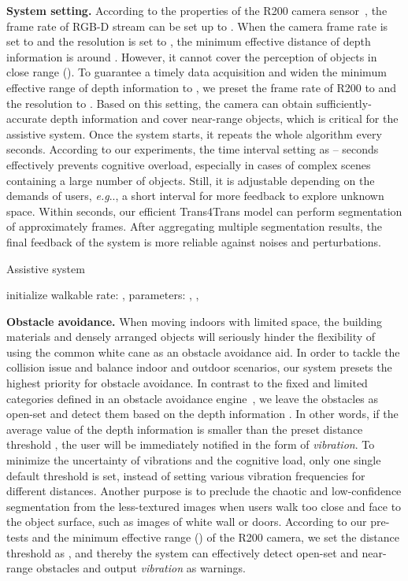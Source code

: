 \documentclass[journal]{IEEEtran}
\makeatletter
\DeclareRobustCommand\onedot{\futurelet\@let@token\@onedot}
\def\@onedot{\ifx\@let@token.\else.\null\fi\xspace}
\def\eg{\emph{e.g}\onedot} \def\Eg{\emph{E.g}\onedot}
\makeatother
\begin{document}
\noindent\textbf{System setting.}
According to the properties of the R200 camera sensor~\cite{keselman2017intel}, the frame rate of RGB-D stream can be set up to . When the camera frame rate is set to  and the resolution is set to , the minimum effective distance of depth information is around . However, it cannot cover the perception of objects in close range (). To guarantee a timely data acquisition and widen the minimum effective range of depth information to , we preset the frame rate of R200 to  and the resolution to .
Based on this setting, the camera can obtain sufficiently-accurate depth information and cover near-range objects, which is critical for the assistive system.
Once the system starts, it repeats the whole algorithm every  seconds. 
According to our experiments, the time interval setting as -- seconds effectively prevents cognitive overload, especially in cases of complex scenes containing a large number of objects. Still, it is adjustable depending on the demands of users, \eg, a short interval for more feedback to explore unknown space. Within  seconds, our efficient Trans4Trans model can perform segmentation of approximately  frames. After aggregating multiple segmentation results, the final feedback of the system is more reliable against noises and perturbations.

\begin{algorithm}[!t]
	\caption{Assistive system}
	\label{algo:system}
    initialize walkable rate: , parameters: , ,  \;
\end{algorithm}

\noindent\textbf{Obstacle avoidance.}
When moving indoors with limited space, the building materials and densely arranged objects will seriously hinder the flexibility of using the common white cane as an obstacle avoidance aid.
In order to tackle the collision issue and balance indoor and outdoor scenarios, our system presets the highest priority for obstacle avoidance.
In contrast to the fixed and limited categories defined in an obstacle avoidance engine~\cite{lin2019deep}, we leave the obstacles as open-set and detect them based on the depth information .
In other words, if the average value of the depth information  is smaller than the preset distance threshold , the user will be immediately notified in the form of \emph{vibration}. To minimize the uncertainty of vibrations and the cognitive load, only one single default threshold is set, instead of setting various vibration frequencies for different distances. Another purpose is to preclude the chaotic and low-confidence segmentation from the less-textured images when users walk too close and face to the object surface, such as images of white wall or doors. According to our pre-tests and the minimum effective range () of the R200 camera, we set the distance threshold as , and thereby the system can effectively detect open-set and near-range obstacles and output \emph{vibration} as warnings.
\end{document}
